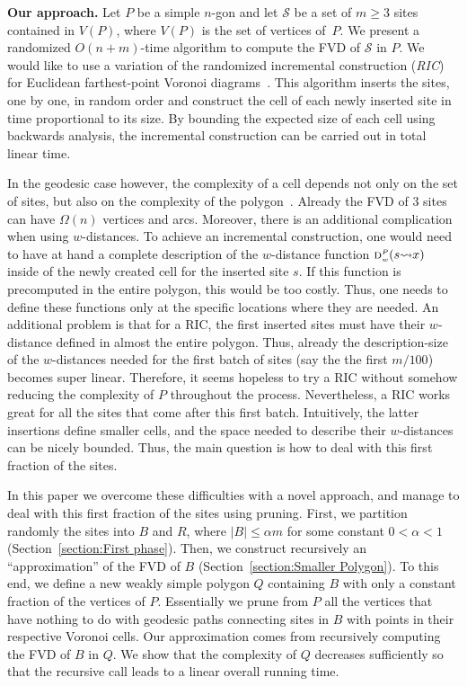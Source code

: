 \documentclass[a4paper, 11pt]{article}
\newcommand{\s}{\mathcal S}
\newcommand{\dd}[3][P]{\ensuremath{\textsc{d}_{\scriptscriptstyle w}^{\scriptscriptstyle #1}(#2 {\leadsto} #3)}}
\begin{document}
\textbf{Our approach.}
Let  $P$ be a simple $n$-gon and let $\s$ be a set of $m\geq 3$ sites contained in $V(P)$, where $V(P)$ is the set of vertices of~$P$.
We present a randomized $O(n+m)$-time algorithm to compute the FVD of $\s$ in $P$.
We would like to use a variation of the randomized incremental construction (\emph{RIC}) for Euclidean farthest-point Voronoi diagrams~\cite{de2000computational}.
This algorithm inserts the sites, one by one, in random order and construct the cell of each newly inserted site in time proportional to its size. 
By bounding the expected size of each cell using backwards analysis, the incremental construction can be carried out in total linear time. 

In the geodesic case however, the complexity of a cell depends not only on the set of sites, but also on the complexity of the polygon~\cite{aronov1989geodesic}. 
Already the FVD of 3 sites can have $\Omega(n)$ vertices and arcs.
Moreover, there is an additional complication when using $w$-distances.
To achieve an incremental construction, one would need to have at hand a complete description of the $w$-distance function $\dd{s}{x}$ inside of the newly created cell for the inserted site $s$.
If this function is precomputed in the entire polygon, this would be too costly. 
Thus, one needs to define these functions only at the specific locations where they are needed. 
An additional problem is that for a RIC, the first inserted sites must have their $w$-distance defined in almost the entire polygon.
Thus, already the description-size of the $w$-distances needed for the first batch of sites (say the the first $m/100$) becomes super linear. 
Therefore, it seems hopeless to try a RIC without somehow reducing the complexity of $P$ throughout the process. 
Nevertheless, a RIC works great for all the sites that come after this first batch. 
Intuitively,  the latter insertions define smaller cells, and the space needed to describe their $w$-distances can be nicely bounded.
Thus, the main question is how to deal with this first fraction of the sites.

In this paper we overcome these difficulties with a novel approach, and manage to deal with this first fraction of the sites using pruning.
First, we partition randomly the sites into $B$ and $R$, where $|B| \leq \alpha m$ for some constant $0 < \alpha < 1$ (Section~\ref{section:First phase}).
Then, we construct recursively an ``approximation'' of the FVD of $B$ (Section~\ref{section:Smaller Polygon}). 
To this end, we define a new weakly simple polygon $Q$ containing $B$ with only a constant fraction of the vertices of $P$. 
Essentially we prune from $P$ all the vertices that have nothing to do with geodesic paths connecting sites in $B$ with points in their respective Voronoi cells. 
Our approximation comes from recursively computing the FVD of $B$ in $Q$. 
We show that the complexity of $Q$ decreases sufficiently so that the recursive call leads to a linear overall running time.
\end{document}
